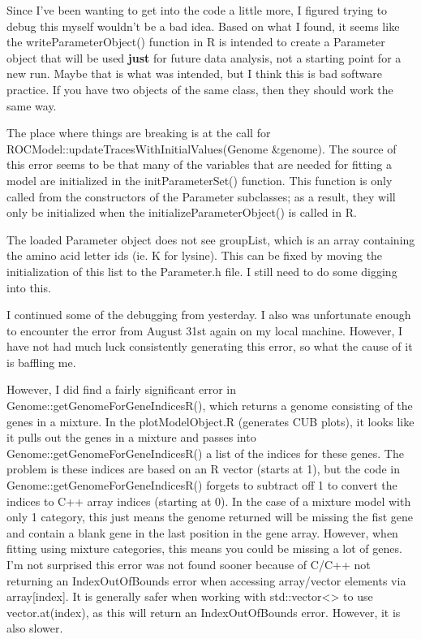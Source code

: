\documentclass[11pt]{labbook}
\begin{document}
Since I've been wanting to get into the code a little more, I figured trying to debug this myself wouldn't be a bad idea. Based on what I found, it seems like the writeParameterObject() function in R is intended to create a Parameter object that will be used \textbf{just} for future data analysis, not a starting point for a new run. Maybe that is what was intended, but I think this is bad software practice. If you have two objects of the same class, then they should work the same way.

The place where things are breaking is at the call for ROCModel::updateTracesWithInitialValues(Genome \&genome). The source of this error seems to be that many of the variables that are needed for fitting a model are initialized in the initParameterSet() function. This function is only called from the constructors of the Parameter subclasses; as a result, they will only be initialized when the initializeParameterObject() is called in R. 

The loaded Parameter object does not see groupList, which is an array containing the amino acid letter ids (ie. K for lysine). This can be fixed by moving the initialization of this list to the Parameter.h file. I still need to do some digging into this.

I continued some of the debugging from yesterday. I also was unfortunate enough to encounter the error from August 31st again on my local machine. However, I have not had much luck consistently generating this error, so what the cause of it is baffling me. 

However, I did find a fairly significant error in  Genome::getGenomeForGeneIndicesR(), which returns a genome consisting of the genes in a mixture. In the plotModelObject.R (generates CUB plots), it looks like it pulls out the genes in a mixture and passes into Genome::getGenomeForGeneIndicesR() a list of the indices for these genes. The problem is these indices are based on an R vector (starts at 1), but the code in Genome::getGenomeForGeneIndicesR() forgets to subtract off 1 to convert the indices to C++ array indices (starting at 0). In the case of a mixture model with only 1 category, this just means the genome returned will be missing the fist gene and contain a blank gene in the last position in the gene array. However, when fitting using mixture categories, this means you could be missing a lot of genes. I'm not surprised this error was not found sooner because of C/C++ not returning an IndexOutOfBounds error when accessing array/vector elements via array[index]. It is generally safer when working with std::vector<> to use vector.at(index), as this will return an IndexOutOfBounds error. However, it is also slower. 
\end{document}
